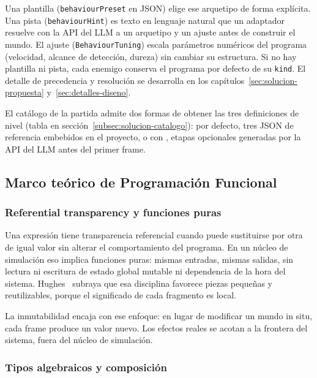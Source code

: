 Una plantilla (\texttt{behaviourPreset} en JSON) elige ese arquetipo de forma
explícita. Una pista (\texttt{behaviourHint}) es texto en lenguaje natural que un
adaptador resuelve con la API del LLM a un arquetipo y un ajuste antes de construir el mundo. El
ajuste (\texttt{BehaviourTuning}) escala parámetros numéricos del programa
(velocidad, alcance de detección, dureza) sin cambiar su estructura. Si no hay
plantilla ni pista, cada enemigo conserva el programa por defecto de su
\texttt{kind}. El detalle de precedencia y resolución se desarrolla en los
capítulos~\ref{sec:solucion-propuesta} y~\ref{sec:detalles-diseno}.

El catálogo de la partida admite dos formas de obtener las tres
definiciones de nivel (tabla en sección~\ref{subsec:solucion-catalogo}): por defecto,
tres JSON de referencia embebidos en el proyecto, o con , etapas
opcionales generadas por la API del LLM antes del primer frame.

\subsection{Marco teórico de Programación Funcional}
\label{subsec:marco-teorico}

\subsubsection{Referential transparency y funciones puras}
\label{subsubsec:teoria-pureza}

Una expresión tiene transparencia referencial cuando puede sustituirse por otra de
igual valor sin alterar el comportamiento del programa. En un núcleo de simulación eso
implica funciones puras: mismas entradas, mismas salidas, sin lectura ni escritura de estado
global mutable ni dependencia de la hora del sistema. Hughes~\cite{hughes1989whyfp} subraya
que esa disciplina favorece piezas pequeñas y reutilizables, porque el significado de cada
fragmento es local.

La inmutabilidad encaja con ese enfoque: en lugar de modificar un mundo in
situ, cada frame produce un valor nuevo. Los efectos reales se acotan a la frontera del
sistema, fuera del núcleo de simulación.

\subsubsection{Tipos algebraicos y composición}
\label{subsubsec:teoria-adts}

